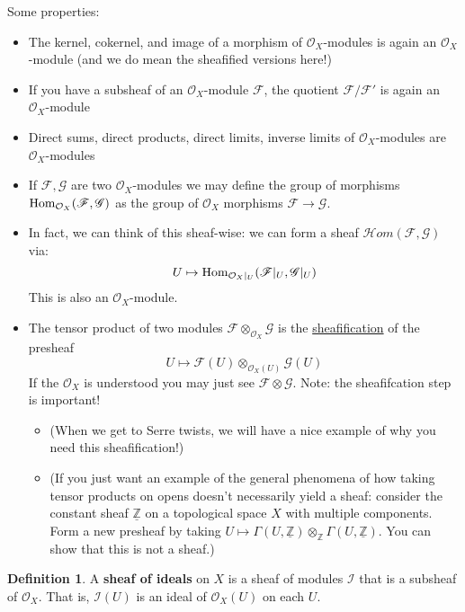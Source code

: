 \documentclass[10pt,reqno]{amsart}
\theoremstyle{definition}
\newtheorem{definition}[theorem]{Definition}
\theoremstyle{remark}
\numberwithin{equation}{section}
\numberwithin{theorem}{section}
\newcommand{\Z}{{\mathbb Z}}
\newcommand{\OO}{{\mathcal O}}
\newcommand{\Hom}{\textup{Hom}}
\newcommand{\scrHom}{\mathscr{H}om}
\newcommand{\FF}{{\mathscr F}}
\newcommand{\GG}{{\mathscr G}}
\begin{document}
Some properties:
\begin{itemize}
\item The kernel, cokernel, and image of a morphism of $\OO_X$-modules is again an $\OO_X$-module (and we do mean the sheafified versions here!)
\item If you have a subsheaf of an $\OO_X$-module $\FF$, the quotient $\FF/\FF'$ is again an $\OO_X$-module
\item Direct sums, direct products, direct limits, inverse limits of $\OO_X$-modules are $\OO_X$-modules
\item If $\FF,\GG$ are two $\OO_X$-modules we may define the group of morphisms $\Hom_{\OO_X}(\FF,\GG)$ as the group of $\OO_X$ morphisms $\FF \to \GG$. 
\item In fact, we can think of this sheaf-wise: we can form a sheaf $\scrHom(\FF,\GG)$ via:
\[U \mapsto \Hom_{\OO_X|_U}(\FF|_U, \GG|_U)\]
This is also an $\OO_X$-module.
\item The tensor product of two modules $\FF \otimes_{\OO_X} \GG$ is the \underline{sheafification} of the presheaf 
\[U \mapsto \FF(U) \otimes_{\OO_X(U)}\GG(U)\]
If the $\OO_X$ is understood you may just see $\FF \otimes \GG$. Note: the sheafifcation step is important!
\begin{itemize}
\item (When we get to Serre twists, we will have a nice example of why you need this sheafification!)
\item (If you just want an example of the general phenomena of how taking tensor products on opens doesn't necessarily yield a sheaf: consider the constant sheaf $\underline{\mathbb{Z}}$ on a topological space $X$ with multiple components. Form a new presheaf by taking $U \mapsto \Gamma(U,\underline{\mathbb{Z}}) \otimes_{\Z}  \Gamma(U,\underline{\mathbb{Z}})$. You can show that this is not a sheaf.)
\end{itemize}
\end{itemize}


\begin{definition} A \textbf{sheaf of ideals} on $X$ is a sheaf of modules $\mathscr{I}$ that is a subsheaf of $\OO_X$. That is, $\mathscr{I}(U)$ is an ideal of $\OO_X(U)$ on each $U$.
\end{definition}
\end{document}
